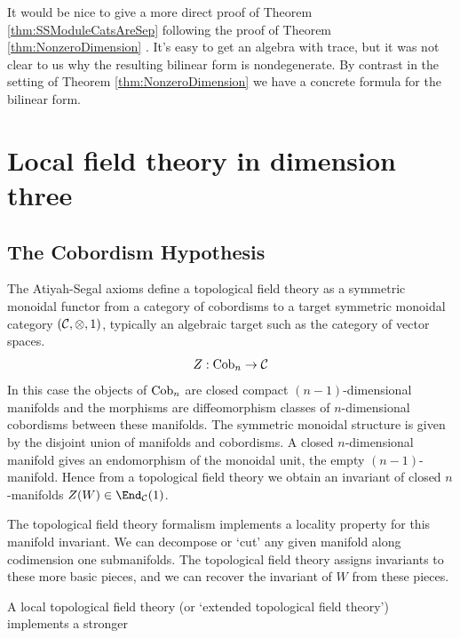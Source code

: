 \documentclass{amsart}
\begin{document}
It would be nice to give a more direct proof of Theorem \ref{thm:SSModuleCatsAreSep} following the proof of Theorem \ref{thm:NonzeroDimension} .  It's easy to get an algebra with trace, but it was not clear to us why the resulting bilinear form is nondegenerate.  By contrast in the setting of Theorem \ref{thm:NonzeroDimension} we have a concrete formula for the bilinear form.


\section{Local field theory in dimension three} \label{sec-lft}

\subsection{The Cobordism Hypothesis}

The Atiyah-Segal axioms define a topological field theory as a symmetric monoidal functor from a category of cobordisms to a target symmetric monoidal category $(\mathcal C, \otimes, 1)$, typically an algebraic target such as the category of vector spaces. 
\begin{equation*}
	Z: \mathrm{Cob}_n \to \mathcal C
\end{equation*}
In this case the objects of $\mathrm{Cob}_n$ are closed compact $(n-1)$-dimensional manifolds and the morphisms are diffeomorphism classes of $n$-dimensional cobordisms between these manifolds. The symmetric monoidal structure is given by the disjoint union of manifolds and cobordisms. A closed $n$-dimensional manifold gives an endomorphism of the monoidal unit, the empty $(n-1)$-manifold. Hence from a topological field theory we obtain an invariant of closed $n$-manifolds $Z(W) \in \End_\cC(1)$.  

The topological field theory formalism implements a locality property for this manifold invariant. We can decompose or `cut' any given manifold along codimension one submanifolds. The topological field theory assigns invariants to these more basic pieces, and we can recover the invariant of $W$ from these pieces. 

A local topological field theory (or `extended topological field theory') implements a stronger 




\end{document}
